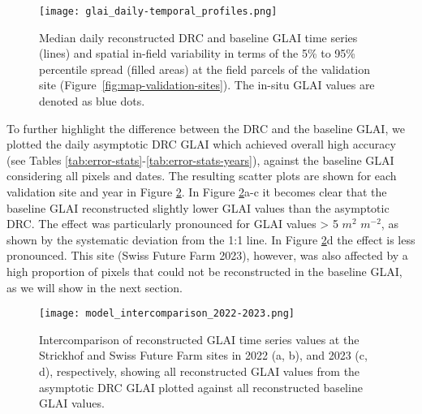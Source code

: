 \begin{figure}[H]
    \centering
    \texttt{[image: glai\_daily-temporal\_profiles.png]}
    \caption{Median daily reconstructed \gls{DRC} and baseline \gls{GLAI} time series (lines) and spatial in-field variability in terms of the 5\% to 95\% percentile spread (filled areas) at the field parcels of the validation site (Figure~\ref{fig:map-validation-sites}). The in-situ \gls{GLAI} values are denoted as blue dots.}
    \label{fig:glai-trajectories}
\end{figure}

To further highlight the difference between the \gls{DRC} and the baseline \gls{GLAI}, we plotted the daily asymptotic \gls{DRC} \gls{GLAI} which achieved overall high accuracy (see Tables \ref{tab:error-stats}-\ref{tab:error-stats-years}), against the baseline \gls{GLAI} considering all pixels and dates. The resulting scatter plots are shown for each validation site and year in Figure \ref{fig:model-intercomparison}. In Figure \ref{fig:model-intercomparison}a-c it becomes clear that the baseline \gls{GLAI} reconstructed slightly lower \gls{GLAI} values than the asymptotic \gls{DRC}. The effect was particularly pronounced for GLAI values > 5 $m^2$ $m^{-2}$, as shown by the systematic deviation from the 1:1 line. In Figure \ref{fig:model-intercomparison}d the effect is less pronounced. This site (Swiss Future Farm 2023), however, was also affected by a high proportion of pixels that could not be reconstructed in the baseline \gls{GLAI}, as we will show in the next section.

\begin{figure}[H]
    \centering
    \texttt{[image: model\_intercomparison\_2022-2023.png]}
    \caption{Intercomparison of reconstructed GLAI time series values at the Strickhof and Swiss Future Farm sites in 2022 (a, b), and 2023 (c, d), respectively, showing all reconstructed GLAI values from the asymptotic DRC GLAI plotted against all reconstructed baseline GLAI values.}
    \label{fig:model-intercomparison}
\end{figure}


